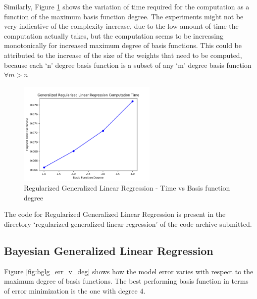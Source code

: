 \documentclass[parskip=full]{scrartcl}
\begin{document}
        Similarly, Figure \ref{fig:rglg_time_v_deg} shows the variation of time required for the computation as a function of the maximum basis function degree. The experiments might not be very indicative of the complexity increase, due to the low amount of time the computation actually takes, but the computation seems to be increasing monotonically for increased maximum degree of basis functions. This could be attributed to the increase of the size of the weights that need to be computed, because each `n' degree basis function is a subset of any `m' degree basis function $\forall m > n$

        \begin{figure}[ht]
            \centering
            \includegraphics[width=0.6\textwidth]{3a_degree_vs_time.png}
            \caption{Regularized Generalized Linear Regression - Time vs Basis function degree}
            \label{fig:rglg_time_v_deg}
        \end{figure}

        The code for Regularized Generalized Linear Regression is present in the directory `regularized-generalized-linear-regression' of the code archive submitted.


    \subsection{Bayesian Generalized Linear Regression} %
    \label{sub:bayesian_generalized_linear_regression}
    
        Figure \ref{fig:bglg_err_v_deg} shows how the model error varies with respect to the maximum degree of basis functions. The best performing basis function in terms of error minimization is the one with degree 4.
\end{document}
